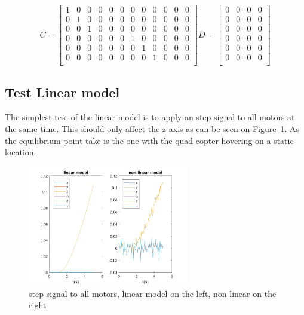$$
C=
\begin{bmatrix}
1 & 0 & 0 & 0 & 0 & 0 & 0 & 0 & 0 & 0 & 0 & 0 \\
0 & 1 & 0 & 0 & 0 & 0 & 0 & 0 & 0 & 0 & 0 & 0 \\
0 & 0 & 1 & 0 & 0 & 0 & 0 & 0 & 0 & 0 & 0 & 0 \\
0 & 0 & 0 & 0 & 0 & 0 & 1 & 0 & 0 & 0 & 0 & 0 \\
0 & 0 & 0 & 0 & 0 & 0 & 0 & 1 & 0 & 0 & 0 & 0 \\
0 & 0 & 0 & 0 & 0 & 0 & 0 & 0 & 1 & 0 & 0 & 0 \\
\end{bmatrix}
D=
\begin{bmatrix}
0 & 0 & 0 & 0\\0 & 0 & 0 & 0\\0 & 0 & 0 & 0\\
0 & 0 & 0 & 0\\0 & 0 & 0 & 0\\0 & 0 & 0 & 0\\
\end{bmatrix}
$$


\subsection{Test Linear model}
The simplest test of the linear model is to apply an step signal to all motors at the same time. This should only affect the z-axis as can be seen on Figure~\ref{fig:test lin model}. As the equilibrium point take is the one with the quad copter hovering on a static location. 
\begin{figure}[H]
	\centering
	\includegraphics[width=7cm]{./img/lin_approx/step_all.png}
	\caption{step signal to all motors, linear model on the left, non linear on the right}
	\label{fig:test lin model}
\end{figure}